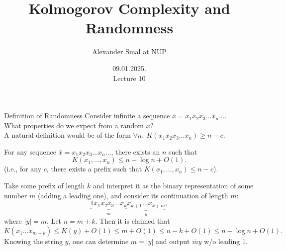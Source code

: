 \documentclass[aspectratio=169]{beamer}
\title{Kolmogorov Complexity and Randomness}
\author{Alexander Smal at NUP}
\date{09.01.2025.\\ Lecture 10}
\begin{document}
\begin{frame}[plain]
    \maketitle
\end{frame}

\begin{frame}{Definition of Randomness}
Consider infinite a sequence $\bar{x} = x_1 x_2 x_3 \dotso x_n \dotso$. \\\pause
What properties do we expect from a random $\bar x$?\\\pause
A natural definition would be of the form $\forall n,\ K(x_1 x_2 x_3 \dotso x_n) \ge n - c$.
\medskip\pause

    For any sequence $\bar{x} = x_1 x_2 x_3 \dotso x_n \dotso$, there exists an $n$ such that
    \[
    K(x_1, \dotsc, x_n) \le n - \log n + O(1).
    \]
    (i.e., for any $c$, there exists a prefix such that $K(x_1, \dotsc, x_n) \le n - c$).
\medskip\pause

    Take some prefix of length $k$ and interpret it as the binary representation of some number $m$ (adding a leading one), and consider its continuation of length $m$:
    \[
    \underbrace{1 x_1 x_2 x_3 \dotso x_k}_{\overline{m}}
    \underbrace{x_{k+1} \dotso x_{k + m}}_y,
    \]
    where $|y| = m$. Let $n = m + k$. Then it is claimed that
    \[
    K(x_1 \dotso x_{m+k}) \le K(y) + O(1) \le m + O(1) \le n - k + O(1) \le n - \log n + O(1).
    \]
    Knowing the string $y$, one can determine $m = |y|$ and output $\overline{m}y$ w/o leading 1.
\end{frame}
\end{document}
